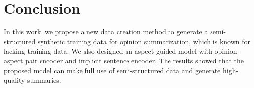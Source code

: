 \section{Conclusion}
\label{sec:conclude}
In this work,
we propose a new data creation method to generate
 a semi-structured synthetic training data for 
opinion summarization,
which is known for lacking training data.
We also designed an aspect-guided model with opinion-aspect pair encoder and implicit sentence encoder.
The results showed that
the proposed model can make full use of semi-structured data
and generate high-quality summaries.



